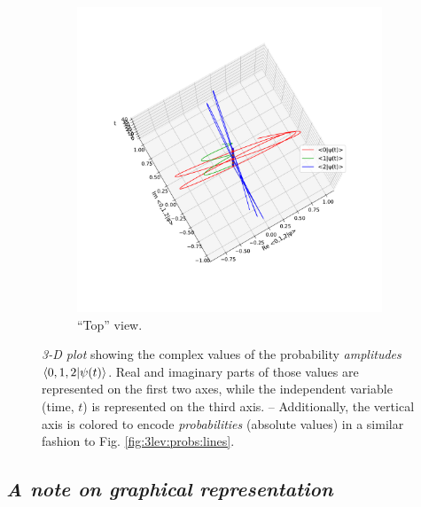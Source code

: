 \begin{figure}[]
\begin{subfigure}[b]{\textwidth}
    \includegraphics[height=0.41\textheight,clip,trim= 20 120 20 220]{img/3ldetect/hermitianSpaceTime_top.pdf}
    \caption{``Top'' view.}
  \end{subfigure}
  \caption[
    Complex values of the
    probability \emph{amplitudes} $\braket{0, 1, 2}{\psi(t)}$.
  ]{
    \textit{3-D plot} showing the complex values of the
    probability \emph{amplitudes} $\braket{0, 1, 2}{\psi(t)}$.
    Real and imaginary parts of those values are represented on
    the first two axes, while the independent variable (time, $t$)
    is represented
    on the third axis.
    -- Additionally, the vertical axis is colored to encode \emph{probabilities}
    (absolute values)
    in a similar fashion to Fig. \ref{fig:3lev:probs:lines}.
  }
  \label{fig:3lev:hermitianEvol}
\end{figure}

\subsection*{\textit{A note on graphical representation}}

